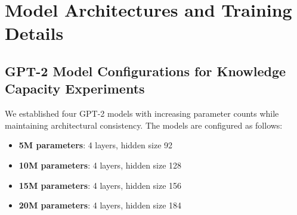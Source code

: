 \documentclass{article} %
\begin{document}










\section{Model Architectures and Training Details} \label{sec:models}

\subsection{GPT-2 Model Configurations for Knowledge Capacity Experiments} \label{subsec:gpt2_knowledge}

We established four GPT-2 models with increasing parameter counts while maintaining architectural consistency. The models are configured as follows:

\begin{itemize}
    \item \textbf{5M parameters}: 4 layers, hidden size 92 
    \item \textbf{10M parameters}: 4 layers, hidden size 128
    \item \textbf{15M parameters}: 4 layers, hidden size 156  
    \item \textbf{20M parameters}: 4 layers, hidden size 184 
\end{itemize}
\end{document}
